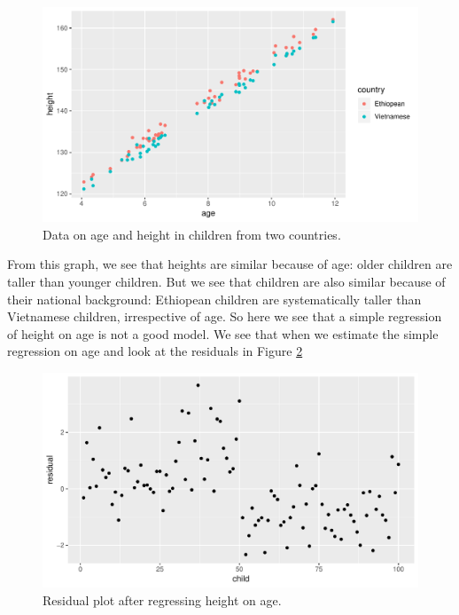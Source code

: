 \documentclass[]{report}\usepackage[]{graphicx}\usepackage[]{color}
\makeatletter
\def\maxwidth{ %
  \ifdim\Gin@nat@width>\linewidth
    \linewidth
  \else
    \Gin@nat@width
  \fi
}
\newenvironment{knitrout}{}{} %
\makeatother
\begin{document}
\begin{knitrout}
\color{fgcolor}\begin{figure}

{\centering \includegraphics[width=\maxwidth]{figure/ass_5-1} 

}

\caption[Data on age and height in children from two countries]{Data on age and height in children from two countries.}\label{fig:ass_5}
\end{figure}


\end{knitrout}

From this graph, we see that heights are similar because of age: older children are taller than younger children. But we see that children are also similar because of their national background: Ethiopean children are systematically taller than Vietnamese children, irrespective of age. So here we see that a simple regression of height on age is not a good model. We see that when we estimate the simple regression on age and look at the residuals in Figure \ref{fig:ass_6}

\begin{knitrout}
\color{fgcolor}\begin{figure}

{\centering \includegraphics[width=\maxwidth]{figure/ass_6-1} 

}

\caption[Residual plot after regressing height on age]{Residual plot after regressing height on age.}\label{fig:ass_6}
\end{figure}


\end{knitrout}
\end{document}
